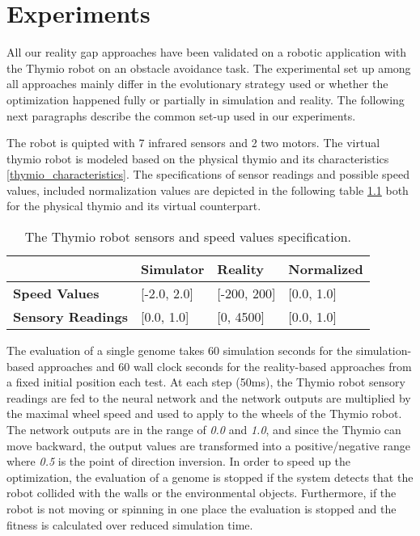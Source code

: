 \chapter{Experiments}

All our reality gap approaches have been validated on a robotic application with the Thymio robot on an obstacle avoidance task. The experimental set up among all approaches mainly differ in the evolutionary strategy used or whether the optimization happened fully or partially in simulation and reality. The following next paragraphs describe the common set-up used in our experiments.

The robot is quipted with 7 infrared sensors and 2 two motors. The virtual thymio robot is modeled based on the physical thymio and its characteristics \ref{thymio_characteristics}. The specifications of sensor readings and possible speed values, included normalization values are depicted in the following table \ref{fig:thymio_specs} both for the physical thymio and its virtual counterpart.

\begin{table}[H]
\begin{tabular}{llll}
\centering
\hline
\textbf{}                            & \textbf{Simulator}    & \textbf{Reality}  & \textbf{Normalized}  \\ \hline
\textbf{Speed Values}                & {[}-2.0, 2.0{]}       & {[}-200, 200{]}      & {[}0.0, 1.0{]} \\
\textbf{Sensory Readings}            & {[}0.0, 1.0{]}        & {[}0, 4500{]}        & {[}0.0, 1.0{]} \\
\end{tabular}
\caption{The Thymio robot sensors and speed values specification.}
\label{fig:thymio_specs}
\end{table}

The evaluation of a single genome takes 60 simulation seconds for the simulation-based approaches and 60 wall clock seconds for the reality-based approaches from a fixed initial position each test. At each step (50ms), the Thymio robot sensory readings are fed to the neural network and the network outputs are multiplied by the maximal wheel speed and used to apply to the wheels of the Thymio robot. The network outputs are in the range of \emph{0.0} and \emph{1.0}, and since the Thymio can move backward, the output values are transformed into a positive/negative range where \emph{0.5} is the point of direction inversion. In order to speed up the optimization, the evaluation of a genome is stopped if the system detects that the robot collided with the walls or the environmental objects. Furthermore, if the robot is not moving or spinning in one place the evaluation is stopped and the fitness is calculated over reduced simulation time.

